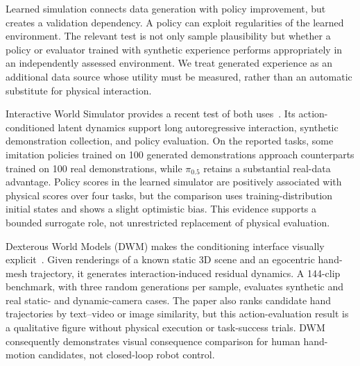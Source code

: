 Learned simulation connects data generation with policy improvement, but creates a validation dependency. A policy can exploit regularities of the learned environment. The relevant test is not only sample plausibility but whether a policy or evaluator trained with synthetic experience performs appropriately in an independently assessed environment. We treat generated experience as an additional data source whose utility must be measured, rather than an automatic substitute for physical interaction.

Interactive World Simulator provides a recent test of both uses~\cite{wang2026interactive}. Its action-conditioned latent dynamics support long autoregressive interaction, synthetic demonstration collection, and policy evaluation. On the reported tasks, some imitation policies trained on 100 generated demonstrations approach counterparts trained on 100 real demonstrations, while $\pi_{0.5}$ retains a substantial real-data advantage. Policy scores in the learned simulator are positively associated with physical scores over four tasks, but the comparison uses training-distribution initial states and shows a slight optimistic bias. This evidence supports a bounded surrogate role, not unrestricted replacement of physical evaluation.

Dexterous World Models (DWM) makes the conditioning interface visually explicit~\cite{kim2026dwm}. Given renderings of a known static 3D scene and an egocentric hand-mesh trajectory, it generates interaction-induced residual dynamics. A 144-clip benchmark, with three random generations per sample, evaluates synthetic and real static- and dynamic-camera cases. The paper also ranks candidate hand trajectories by text--video or image similarity, but this action-evaluation result is a qualitative figure without physical execution or task-success trials. DWM consequently demonstrates visual consequence comparison for human hand-motion candidates, not closed-loop robot control.

